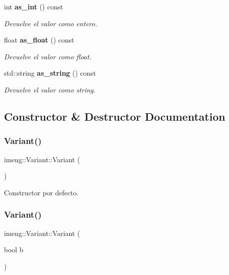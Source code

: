 \begin{DoxyCompactItemize}
int \textbf{ as\+\_\+int} () const
\begin{DoxyCompactList}\small\item\em Devuelve el valor como entero. \end{DoxyCompactList}\item 
float \textbf{ as\+\_\+float} () const
\begin{DoxyCompactList}\small\item\em Devuelve el valor como float. \end{DoxyCompactList}\item 
std\+::string \textbf{ as\+\_\+string} () const
\begin{DoxyCompactList}\small\item\em Devuelve el valor como string. \end{DoxyCompactList}\end{DoxyCompactItemize}


\subsection{Constructor \& Destructor Documentation}
\mbox{\label{classimeng_1_1_variant_a1ea57c363c4a7e1240663a4cbb5ec878}} 
\subsubsection{Variant()\hspace{0.1cm}{\footnotesize\ttfamily [1/5]}}
{\footnotesize\ttfamily imeng\+::\+Variant\+::\+Variant (\begin{DoxyParamCaption}{ }\end{DoxyParamCaption})\hspace{0.3cm}{\ttfamily [inline]}}



Constructor por defecto. 

\mbox{\label{classimeng_1_1_variant_a8f9132530854af6c081c85317bc3c649}} 
\subsubsection{Variant()\hspace{0.1cm}{\footnotesize\ttfamily [2/5]}}
{\footnotesize\ttfamily imeng\+::\+Variant\+::\+Variant (\begin{DoxyParamCaption}\item[{bool}]{b }\end{DoxyParamCaption})\hspace{0.3cm}{\ttfamily [inline]}}



